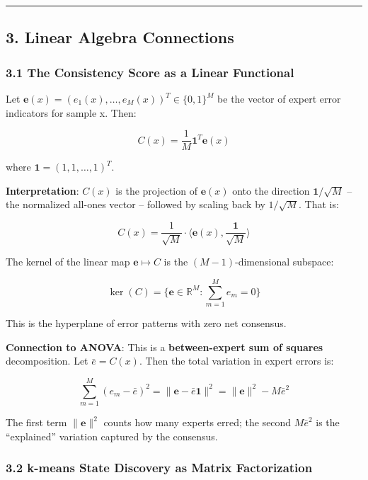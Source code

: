 \documentclass[
  12pt,
]{ctexart}
\begin{document}
\begin{center}\rule{0.5\linewidth}{0.5pt}\end{center}

\subsection{3. Linear Algebra
Connections}\label{linear-algebra-connections}

\subsubsection{3.1 The Consistency Score as a Linear
Functional}\label{the-consistency-score-as-a-linear-functional}

Let \(\mathbf{e}(x) = (e_1(x), \dots, e_M(x))^T \in \{0,1\}^M\) be the
vector of expert error indicators for sample x. Then:

\[C(x) = \frac{1}{M} \mathbf{1}^T \mathbf{e}(x)\]

where \(\mathbf{1} = (1,1,\dots,1)^T\).

\textbf{Interpretation}: \(C(x)\) is the projection of \(\mathbf{e}(x)\)
onto the direction \(\mathbf{1}/\sqrt{M}\) -- the normalized all-ones
vector -- followed by scaling back by \(1/\sqrt{M}\). That is:

\[C(x) = \frac{1}{\sqrt{M}} \cdot \langle \mathbf{e}(x), \frac{\mathbf{1}}{\sqrt{M}} \rangle\]

The kernel of the linear map \(\mathbf{e} \mapsto C\) is the
\((M-1)\)-dimensional subspace:

\[\ker(C) = \{\mathbf{e} \in \mathbb{R}^M : \sum_{m=1}^M e_m = 0\}\]

This is the hyperplane of error patterns with zero net consensus.

\textbf{Connection to ANOVA}: This is a \textbf{between-expert sum of
squares} decomposition. Let \(\bar{e} = C(x)\). Then the total variation
in expert errors is:

\[\sum_{m=1}^M (e_m - \bar{e})^2 = \|\mathbf{e} - \bar{e}\mathbf{1}\|^2 = \|\mathbf{e}\|^2 - M\bar{e}^2\]

The first term \(\|\mathbf{e}\|^2\) counts how many experts erred; the
second \(M\bar{e}^2\) is the ``explained'' variation captured by the
consensus.

\subsubsection{3.2 k-means State Discovery as Matrix
Factorization}\label{k-means-state-discovery-as-matrix-factorization}
\end{document}
